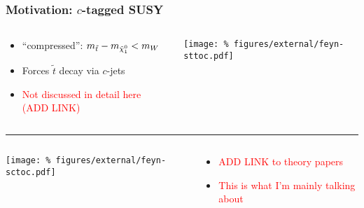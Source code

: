 \documentclass[usenames,dvipsnames]{beamer}
\begin{document}
\begin{frame}
  \frametitle{Motivation: $c$-tagged SUSY}
  \begin{columns}
    \begin{column}{0.6\textwidth}
      \begin{itemize}
      \item ``compressed'': $m_{\tilde{t}} - m_{\tilde{\chi}_1^0} < m_W$
      \item Forces $\tilde{t}$ decay via $c$-jets
      \item \textcolor{red}{Not discussed in detail here (ADD LINK)}
      \end{itemize}
    \end{column}
    \begin{column}{0.4\textwidth}
      \texttt{[image: \%
figures/external/feyn-sttoc.pdf]}
    \end{column}
  \end{columns}
  \hrule
  \begin{columns}
    \begin{column}{0.4\textwidth}
      \texttt{[image: \%
figures/external/feyn-sctoc.pdf]}
    \end{column}
    \begin{column}{0.6\textwidth}
      \begin{itemize}
      \item \textcolor{red}{ADD LINK to theory papers}
      \item \textcolor{red}{This is what I'm mainly talking about}
      \end{itemize}
    \end{column}
  \end{columns}
\end{frame}
\end{document}
